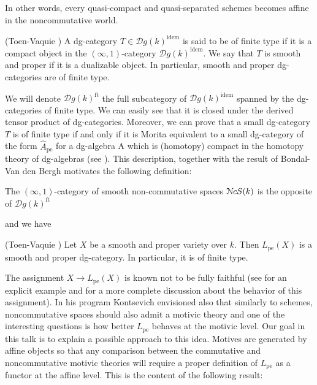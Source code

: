 \begin{refsection}
In other words, every quasi-compact and quasi-separated schemes becomes affine in the noncommutative world.

\begin{defin}(Toen-Vaquie \cite{toen-vaquie})
A dg-category $T\in \mathcal{D}g(k)^\mathrm{idem}$ is said to be of finite type if it is a compact object in the $(\infty,1)$-category $\mathcal{D}g(k)^\mathrm{idem}$.  We say that $T$ is smooth and proper if it is a dualizable object. In particular, smooth and proper dg-categories are of finite type. 
\end{defin}

We will denote $\mathcal{D}g(k)^\mathrm{ft}$ the full subcategory of $\mathcal{D}g(k)^\mathrm{idem}$ spanned by the dg-categories of finite type. We can easily see that it is closed under the derived tensor product of dg-categories. Moreover, we can prove that a small dg-category $T$ is of finite type if and only if it is Morita equivalent to a small dg-category of the form $\widehat{A}_\mathrm{pe}$ for a dg-algebra A which is (homotopy) compact in the homotopy theory of dg-algebras (see \cite{toen-vaquie}). This description, together with the result of Bondal- Van den Bergh motivates the following definition:

\begin{defin}
The $(\infty,1)$-category of smooth non-commutative spaces $\mathcal{N}cS(k)$ is the opposite of $\mathcal{D}g(k)^\mathrm{ft}$
\end{defin}

\noindent and we have

\begin{prop}(Toen-Vaquie \cite[3.27]{toen-vaquie})
Let $X$ be a smooth and proper variety over $k$. Then $L_\mathrm{pe}(X)$ is a smooth and proper dg-category. In particular, it is of finite type.
\end{prop}

The assignment $X\to L_{\mathrm{pe}}(X)$ is known not to be fully faithful (see \cite{MR2067481} for an explicit example and \cite{MR2296422} for a more complete discussion about the behavior of this assignment). In his program \cite{kontsevich1, kontsevich2} Kontsevich envisioned also that similarly to schemes, noncommutative spaces should also admit a motivic theory and one of the interesting questions is how better $L_\mathrm{pe}$ behaves at the motivic level. Our goal in this talk is to explain a possible approach to this idea. Motives are generated by affine objects so that any comparison between the commutative and noncommutative motivic theories will require a proper definition of $L_\mathrm{pe}$ as a functor at the affine level. This is the content of the following result:


\end{refsection}
